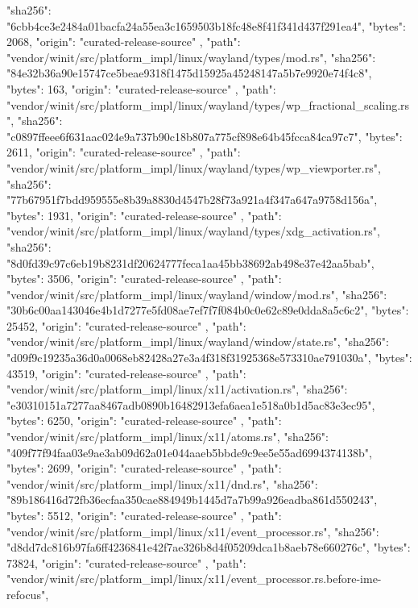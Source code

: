{{      "sha256": "6cbb4ce3e2484a01bacfa24a55ea3c1659503b18fc48e8f41f341d437f291ea4",
      "bytes": 2068,
      "origin": "curated-release-source"
    },
    {
      "path": "vendor/winit/src/platform_impl/linux/wayland/types/mod.rs",
      "sha256": "84e32b36a90e15747ce5beae9318f1475d15925a45248147a5b7e9920e74f4c8",
      "bytes": 163,
      "origin": "curated-release-source"
    },
    {
      "path": "vendor/winit/src/platform_impl/linux/wayland/types/wp_fractional_scaling.rs",
      "sha256": "c0897ffeee6f631aac024e9a737b90c18b807a775cf898e64b45fcca84ca97c7",
      "bytes": 2611,
      "origin": "curated-release-source"
    },
    {
      "path": "vendor/winit/src/platform_impl/linux/wayland/types/wp_viewporter.rs",
      "sha256": "77b67951f7bdd959555e8b39a8830d4547b28f73a921a4f347a647a9758d156a",
      "bytes": 1931,
      "origin": "curated-release-source"
    },
    {
      "path": "vendor/winit/src/platform_impl/linux/wayland/types/xdg_activation.rs",
      "sha256": "8d0fd39c97c6eb19b8231df20624777feca1aa45bb38692ab498e37e42aa5bab",
      "bytes": 3506,
      "origin": "curated-release-source"
    },
    {
      "path": "vendor/winit/src/platform_impl/linux/wayland/window/mod.rs",
      "sha256": "30b6c00aa143046e4b1d7277e5fd08ae7ef7f7f084b0c0e62c89e0dda8a5c6c2",
      "bytes": 25452,
      "origin": "curated-release-source"
    },
    {
      "path": "vendor/winit/src/platform_impl/linux/wayland/window/state.rs",
      "sha256": "d09f9c19235a36d0a0068eb82428a27e3a4f318f31925368e573310ae791030a",
      "bytes": 43519,
      "origin": "curated-release-source"
    },
    {
      "path": "vendor/winit/src/platform_impl/linux/x11/activation.rs",
      "sha256": "e30310151a7277aa8467adb0890b16482913efa6aea1e518a0b1d5ac83e3ec95",
      "bytes": 6250,
      "origin": "curated-release-source"
    },
    {
      "path": "vendor/winit/src/platform_impl/linux/x11/atoms.rs",
      "sha256": "409f77f94faa03e9ae3ab09d62a01e044aaeb5bbde9c9ee5e55ad6994374138b",
      "bytes": 2699,
      "origin": "curated-release-source"
    },
    {
      "path": "vendor/winit/src/platform_impl/linux/x11/dnd.rs",
      "sha256": "89b186416d72fb36ecfaa350cae884949b1445d7a7b99a926eadba861d550243",
      "bytes": 5512,
      "origin": "curated-release-source"
    },
    {
      "path": "vendor/winit/src/platform_impl/linux/x11/event_processor.rs",
      "sha256": "d8dd7dc816b97fa6ff4236841e42f7ae326b8d4f05209dca1b8aeb78e660276c",
      "bytes": 73824,
      "origin": "curated-release-source"
    },
    {
      "path": "vendor/winit/src/platform_impl/linux/x11/event_processor.rs.before-ime-refocus",
}}
